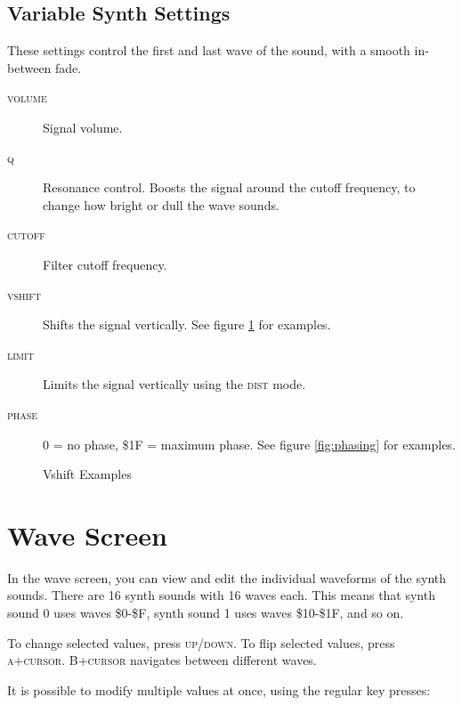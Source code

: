 \subsection{Variable Synth Settings}

These settings control the first and last wave of the sound, with a smooth in-between fade.

\begin{description}
\item[\textsc{volume}] Signal volume.
\item[\textsc{q}] Resonance control. Boosts the signal around the cutoff frequency, to change how bright or dull the wave sounds.
\item[\textsc{cutoff}] Filter cutoff frequency.
\item[\textsc{vshift}] Shifts the signal vertically. See figure \ref{fig:vshift} for examples.
\item[\textsc{limit}] Limits the signal vertically using the \textsc{dist} mode.
\item[\textsc{phase}] 0 = no phase, \$1F = maximum phase. See figure \ref{fig:phasing} for examples.
\end{description}

\begin{figure}[htpb]
	\centering


	\caption{Vshift Examples}
	\label{fig:vshift}
\end{figure}

\section{Wave Screen}
\label{wave-screen-section}

In the wave screen, you can view and edit the individual waveforms of the synth sounds. There are 16 synth sounds with 16 waves each. This means that synth sound 0 uses waves \$0-\$F, synth sound 1 uses waves \$10-\$1F, and so on.

To change selected values, press \textsc{up/down}. To flip selected values, press \textsc{a+cursor}. \textsc{B+cursor} navigates between different waves.

It is possible to modify multiple values at once, using the regular key presses:

